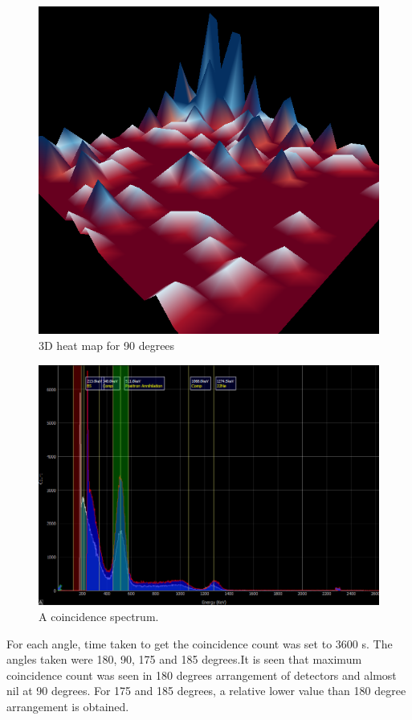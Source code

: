 \documentclass[a4paper, amsfonts, amssymb, amsmath, reprint, showkeys, nofootinbib, twoside]{revtex4-1}
\begin{document}
\begin{figure}[H]
	\centering
	\includegraphics[scale=0.34]{90} 
	\caption{3D heat map for 90 degrees }
	\label{s}
\end{figure}

\begin{figure}[ht]
	\centering
	\includegraphics[scale=0.56]{s} 
	\caption{A coincidence spectrum.}
	\label{s}
\end{figure}


For each angle, time taken to get the coincidence count was set to 3600 s. The angles taken were 180, 90, 175 and 185 degrees.It is seen that maximum coincidence count was seen in 180 degrees arrangement of detectors and almost nil at 90 degrees. For 175 and 185 degrees, a relative lower value than 180 degree arrangement is obtained. 
 
\end{document}
